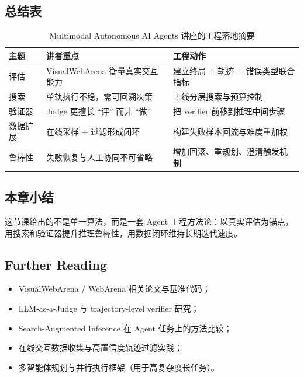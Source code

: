 \documentclass[a4paper]{article}
\begin{document}
\subsection{总结表}
\begin{table}[H]
\centering
\small
\begin{tabular}{p{2.6cm}p{3.9cm}p{4.3cm}}
\toprule
\textbf{主题} & \textbf{讲者重点} & \textbf{工程动作} \\
\midrule
评估 & VisualWebArena 衡量真实交互能力 & 建立终局 + 轨迹 + 错误类型联合指标 \\
搜索 & 单轨执行不稳，需可回溯决策 & 上线分层搜索与预算控制 \\
验证器 & Judge 更擅长 ``评'' 而非 ``做'' & 把 verifier 前移到推理中间步骤 \\
数据扩展 & 在线采样 + 过滤形成闭环 & 构建失败样本回流与难度重加权 \\
鲁棒性 & 失败恢复与人工协同不可省略 & 增加回滚、重规划、澄清触发机制 \\
\bottomrule
\end{tabular}
\caption{Multimodal Autonomous AI Agents 讲座的工程落地摘要}
\end{table}

\subsection{本章小结}
这节课给出的不是单一算法，而是一套 Agent 工程方法论：以真实评估为锚点，用搜索和验证器提升推理鲁棒性，用数据闭环维持长期迭代速度。

\subsection{Further Reading}
\begin{itemize}
    \item VisualWebArena / WebArena 相关论文与基准代码；
    \item LLM-as-a-Judge 与 trajectory-level verifier 研究；
    \item Search-Augmented Inference 在 Agent 任务上的方法比较；
    \item 在线交互数据收集与高置信度轨迹过滤实践；
    \item 多智能体规划与并行执行框架（用于高复杂度长任务）。
\end{itemize}
\end{document}
